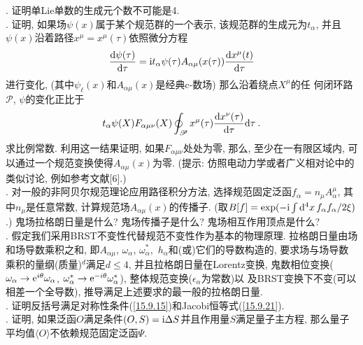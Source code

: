 . 证明单Lie单数的生成元个数不可能是4.\\

. 证明, 如果场$\psi (x)$属于某个规范群的一个表示,
该规范群的生成元为$t_{\alpha }$, 并且$\psi (x)$沿着路径$x^{\mu }=x^{\mu }(\tau)$依照微分方程
\[
\frac{\mathrm{d}\psi (\tau )}{\mathrm{d}\tau }=\mathrm{i} t_{\alpha }\psi (\tau )A_{\alpha \mu
}(x(\tau ))\frac{\mathrm{d} x^{\mu }(t)}{\mathrm{d}\tau }
\]%
进行变化, (其中$\psi _{\ell }(x)$和$A_{\alpha \mu }(x)$是经典c-数场) 那么沿着绕点$X^{\mu }$的任%
何{}闭环路$\mathscr{P}$, $\psi$的变化正比于
\[
t_{\alpha }\psi (X)F_{\alpha \mu \nu }(X)\oint\nolimits_{\mathscr{P}}x^{\mu
}(\tau )\frac{\mathrm{d} x^{\nu }(\tau )}{\mathrm{d}\tau }\mathrm{d}\tau \:. 
\]%
求比例常数. 利用这一结果证明, 如果$F_{\alpha \mu \nu }$处处为零, 那么, 至少在一有限区域内, 可以通过一个规范变换使得$%
A_{\alpha \mu }(x)$为零. (提示: 仿照电动力学或者广义相对论中的类似讨论, 例如参考文献[6].)\\

. 对一般的非阿贝尔规范理论应用路径积分方法, 选择规范固定泛函$f_{\alpha }=n_{\mu }A_{\alpha }^{\mu }$, 
其中$n_{\mu }$是任意常数, 计算规范场$A_{\alpha \mu }(x)$的传播子. 
(取$B[f]=\exp (-\mathrm{i}\int \mathrm{d}^{4}x\,f_{\alpha }f_{\alpha }/2\xi )$.) 鬼场拉格朗日量是什么?
鬼场传播子是什么? 鬼场相互作用顶点是什么?\\

. 假定我们采用BRST不变性代替规范不变性作为基本的物理原理. 拉格朗日量由场和场导数乘积之和, 
即$A_{\alpha \mu }$, $\omega _{\alpha }$, $\omega _{\alpha }^{\ast },$ $h_{\alpha }$和(或)它们的导数构造的, 
要求场与场导数乘积的量纲(质量)$^{d}$满足$d\leq 4$, 并且拉格朗日量在Lorentz变换, 鬼数相位变换($\omega _{\alpha }\rightarrow \me%
^{i\theta }\omega _{\alpha }$, $\omega _{\alpha }^{\ast }\rightarrow \me%
^{-i\theta }\omega _{\alpha }^{\ast }$), 整体规范变换($\epsilon _{\alpha }$为常数)以%
及BRST变换下不变(可以相差一个全导数), 推导满足上述要求的最一般的拉格朗日量.\\

. 证明反括号满足对称性条件(\ref{15.9.15})和Jacobi恒等式(\ref{15.9.21}).\\

. 证明, 如果泛函$O$满足条件$(O,S)=\mathrm{i}\Delta S$并且作用量$S
$满足量子主方程, 那么量子平均值$\langle O\rangle $不依赖规范固定泛函$\Psi $.

\renewcommand{\sectionmark}[1]{\markright{ #1}{}}
\renewcommand{\bibname}{参考文献}

